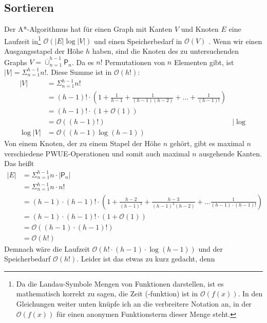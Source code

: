 \documentclass[a4paper,10pt,ngerman]{scrartcl}
\begin{document}
\subsection{Sortieren}
Der A*-Algorithmus hat für einen Graph mit Kanten $V$ und Knoten $E$ eine
Laufzeit in\footnote{Da die Landau-Symbole Mengen von Funktionen darstellen, ist es mathematisch korrekt zu sagen, die Zeit (-funktion) ist in $\mathcal{O}(f(x))$.
In den Gleichungen weiter unten knüpfe ich an die verbreitere Notation an, in der $\mathcal{O}(f(x))$ für einen anonymen Funktionsterm dieser Menge steht.} 
$\mathcal{O}(|E| \log |V|)$ und einen Speicherbedarf in
$\mathcal{O}(V)$ \cite[654]{sedgewick_wayne_2011}. Wenn wir einen
Ausgangsstapel der Höhe $h$ haben, sind die Knoten des zu untersuchenden Graphs
$V = \overset{.}\cup_{n=1}^{h-1} \mathsf{P}_n$. Da es $n!$ Permutationen von
$n$ Elementen gibt, ist $|V| = \Sigma_{n=1}^{h-1}n!$. Diese Summe ist in
$\mathcal{O}(h!)$:
\begin{align*}
  |V| & = \Sigma_{n=1}^{h-1}n!                                                                \\
      & = (h-1)! \cdot (1 + \frac{1}{h-1} + \frac{1}{(h-1)(h-2)} + \ldots + \frac{1}{(h-1)!}) \\
      & = (h-1)! \cdot (1 + \mathcal{O}(1))                                                   \\
      & = \mathcal{O}((h-1)!) & | \log \\
  \log |V| & = \mathcal{O}((h-1) \log (h-1))
\end{align*}
Von einem Knoten, der zu einem Stapel der Höhe $n$ gehört, gibt es maximal $n$ verschiedene PWUE-Operationen und somit auch maximal $n$ ausgehende Kanten. Das heißt
\begin{align*}
  |E| & = \Sigma_{n=1}^{h-1} n \cdot |\mathsf{P}_n|                                                   \\
      & = \Sigma_{n=1}^{h-1} n \cdot n!                                                               \\
      & = (h-1) \cdot (h-1)! \cdot (1 + \frac{h-2}{(h-1)^2} + \frac{h-3}{(h-1)^2(h-2)} + \ldots \frac{1}{(h-1) \cdot (h-1)!})\\
      & = (h-1) \cdot (h-1)! \cdot (1 + \mathcal{O}(1)) \\
      & = \mathcal{O}((h-1) \cdot (h-1)!) \\
      & = \mathcal{O}(h!)
\end{align*}
Demnach wäre die Laufzeit $\mathcal{O}(h! \cdot (h-1) \cdot \log (h-1))$ und der Speicherbedarf $\mathcal{O}(h!)$. Leider ist das etwas zu kurz gedacht, denn
\end{document}
